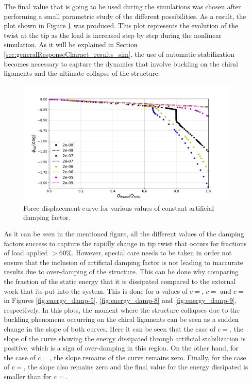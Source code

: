     The final value that is going to be used during the simulations was chosen after performing a small parametric study of the different possibilities. As a result, the plot shown in Figure \ref{fig:forceDisplacement-damp} was produced. This plot represents the evolution of the twist at the tip as the load is increased step by step during the nonlinear simulation. As it will be explained in Section \ref{sec:generalResponseCharact_results_sim}, the use of automatic stabilization becomes necessary to capture the dynamics that involve buckling on the chiral ligaments and the ultimate collapse of the structure.

    \begin{figure}[!htpb]
      \centering
      \includegraphics[width=0.8 \textwidth]{../figures/result-model/forceDisplacement-damp}
      \caption[Force-displacement curve for various values of constant artificial damping factor]{Force-displacement curve for various values of constant artificial damping factor.}\label{fig:forceDisplacement-damp}
    \end{figure}

    As it can be seen in the mentioned figure, all the different values of the damping factors success to capture the rapidly change in tip twist that occurs for fractions of load applied $>60\%$. However, special care needs to be taken in order not ensure that the inclusion of artificial damping factor is not leading to inaccurate results due to over-damping of the structure. This can be done why comparing the fraction of the static energy that it is dissipated compared to the external work that its put into the system. This is done for a values of $c =$, $c =$ and $c =$ in Figures \ref{fig:energy_damp-5}, \ref{fig:energy_damp-8} and \ref{fig:energy_damp-9}, respectively. In this plots, the moment where the structure collapses due to the buckling phenomena occurring on the chiral ligaments can be seen as a sudden change in the slope of both curves. Here it can be seen that the case of $c =$, the slope of the curve showing the energy dissipated through artificial stabilization is positive, which is a sign of over-damping in this region. On the other hand, for the case of $c =$, the slope remains of the curve remains zero. Finally, for the case of $c =$, the slope also remains zero and the final value for the energy dissipated is smaller than for $c =$.

